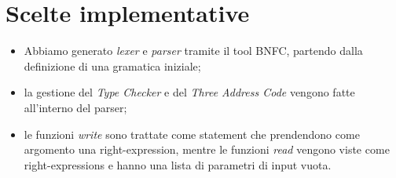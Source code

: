 \documentclass[12pt]{article}
\begin{document}
\section{Scelte implementative}
\begin{itemize}
\item Abbiamo generato \textit{lexer} e \textit{parser} tramite il tool BNFC, partendo dalla definizione di una gramatica iniziale;
\item la gestione del \textit{Type Checker} e del \textit{Three Address Code} vengono fatte all'interno del parser;
\item le funzioni \textit{write} sono trattate come statement che prendendono come argomento una right-expression, mentre le funzioni \textit{read} vengono viste come right-expressions e hanno una lista di parametri di input vuota.
\end{itemize}
\end{document}
